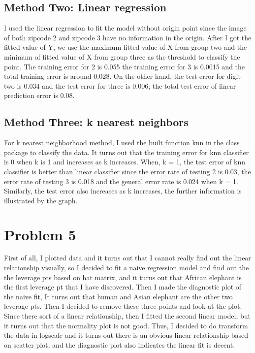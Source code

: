 \documentclass{article}\usepackage[]{graphicx}\usepackage[]{color}
\begin{document}
\subsection*{Method Two: Linear regression}
I used the linear regression to fit the model without origin point since the image of both zipcode 2 and zipcode 3 have no information in the origin. After I got the fitted value of Y, we use the maximum fitted value of X from group two and the minimum of fitted value of X from group three as the threshold to classify the point. The training error for 2 is 0.055 the training error for 3 is 0.0015 and the total training error is around 0.028. On the other hand, the test error for digit two is 0.034 and the test error for three is 0.006; the total test error of linear prediction error is 0.08.

\subsection*{Method Three: k nearest neighbors}
For k nearest neighborhood method, I used the built function knn in the class package to classify the data. It turns out that the training error for knn classifier is 0 when k is 1 and increases as k increases. When, k  = 1, the test error of knn classifier is better than linear classifier since the error rate of testing 2 is 0.03, the error rate of testing 3 is 0.018 and the general error rate is 0.024 when k = 1. Similarly, the test error also increases as k increases, the further information is illustrated by the graph.

\section*{Problem 5}
First of all, I plotted data and it turns out that I cannot really find out the linear relationship visually, so I decided to fit a naive regression model and find out the the leverage pts based on hat matrix, and it turns out that African elephant is the first leverage pt that I have discovered. Then I made the diagnostic plot of the naive fit, It turns out that human and Asian elephant are the other two leverage pts. Then I decided to remove these three points and look at the plot.
Since there sort of a linear relationship, then I fitted the second linear model, but it turns out that the normality plot is not good. Thus, I decided to do transform the data in logscale and it turns out there is an obvious linear relationship based on scatter plot, and the diagnostic plot also indicates the linear fit is decent.
\end{document}
